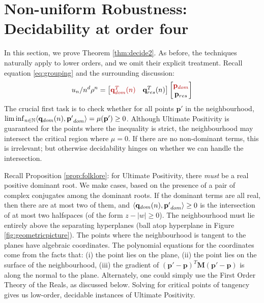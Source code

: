 \section{Non-uniform Robustness: Decidability at order four}
\label{section:decidability2}


In this section, we prove Theorem \ref{thm:decide2}. As before, the techniques naturally apply to lower orders, and we omit their explicit treatment. Recall equation \ref{eq:grouping} and the surrounding discussion:
\begin{equation}
u_n/n^d\rho^n = \begin{bmatrix}
{\color{red!70!black} \mathbf{q}_{dom}^T(n) } & \mathbf{q}_{res}^T(n)
\end{bmatrix}
\begin{bmatrix}
{\color{red!70!black} \mathbf{p}_{dom}} \\
\mathbf{p}_{res}
\end{bmatrix}
\end{equation}
The crucial first task is to check whether for all points $\mathbf{p'}$ in the neighbourhood, \\$\liminf_{n\in\mathbb{N}}\langle\mathbf{q}_{dom}(n), \mathbf{p'}_{dom}\rangle = \mu(\mathbf{p'}) \ge 0$. Although Ultimate Positivity is guaranteed for the points where the inequality is strict, the neighbourhood may intersect the critical region where $\mu = 0$. If there are no non-dominant terms, this is irrelevant; but otherwise decidability hinges on whether we can handle the intersection.

Recall Proposition \ref{prop:folklore}: for Ultimate Positivity, there \textit{must} be a real positive dominant root. We make cases, based on the presence of a pair of complex conjugates among the dominant roots. If the dominant terms are all real, then there are at most two of them, and $\langle\mathbf{q}_{dom}(n), \mathbf{p'}_{dom}\rangle \ge 0$ is the intersection of at most two halfspaces (of the form $z - |w| \ge 0$). The neighbourhood must lie entirely above the separating hyperplanes (ball atop hyperplane in Figure \ref{fig:geometricpicture}). The points where the neighbourhood is tangent to the planes have algebraic coordinates. The polynomial equations for the coordinates come from the facts that: (i) the point lies on the plane, (ii) the point lies on the surface of the neighbourhood, (iii) the gradient of $(\mathbf{p'} - \mathbf{p})^T\mathbf{M}(\mathbf{p'} - \mathbf{p})$ is along the normal to the plane. Alternately, one could simply use the First Order Theory of the Reals, as discussed below. Solving for critical points of tangency gives us low-order, decidable instances of Ultimate Positivity.

